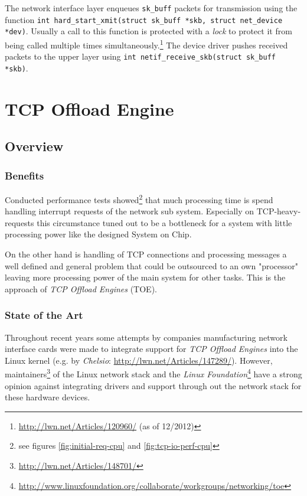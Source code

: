 The network interface layer enqueues \texttt{sk\_buff} packets for transmission using the function \texttt{int hard\_start\_xmit(struct sk\_buff *skb, struct net\_device *dev)}. Usually a call to this function is protected with a \textit{lock} to protect it from being called multiple times simultaneously.\footnote{\url{http://lwn.net/Articles/120960/} (as of 12/2012)} The device driver pushes received packets to the upper layer using \texttt{int netif\_receive\_skb(struct sk\_buff *skb)}. \cite{netstackana}

\chapter{TCP Offload Engine}

\section{Overview}

\subsection{Benefits}

Conducted performance tests showed\footnote{see figures \ref{fig:initial-req-cpu} and \ref{fig:tcp-io-perf-cpu}} that much processing time is spend handling interrupt requests of the network sub system. Especially on TCP-heavy-requests this circumstance tuned out to be a bottleneck for a system with little processing power like the designed System on Chip.

On the other hand is handling of TCP connections and processing messages a well defined and general problem that could be outsourced to an own "processor" leaving more processing power of the main system for other tasks. This is the approach of \textit{TCP Offload Engines} (TOE).
\\

\subsection{State of the Art}

Throughout recent years some attempts by companies manufacturing network interface cards were made to integrate support for \textit{TCP Offload Engines} into the Linux kernel (e.g. by \textit{Chelsio}: \url{http://lwn.net/Articles/147289/}). However, maintainers\footnote{\url{http://lwn.net/Articles/148701/}} of the Linux network stack and the \textit{Linux Foundation}\footnote{\url{http://www.linuxfoundation.org/collaborate/workgroups/networking/toe}} have a strong opinion against integrating drivers and support through out the network stack for these hardware devices.

